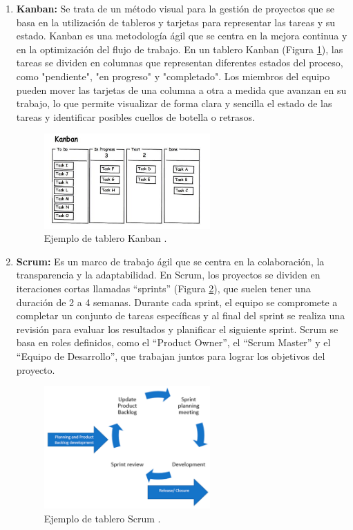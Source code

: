 \begin{enumerate}
    \item \textbf{Kanban:} Se trata de un método visual para la gestión de proyectos que se basa en la utilización de tableros y tarjetas para representar las tareas y su estado. Kanban es una metodología ágil que se centra en la mejora continua y en la optimización del flujo de trabajo. En un tablero Kanban (Figura \ref{fig:kanban}), las tareas se dividen en columnas que representan diferentes estados del proceso, como "pendiente", "en progreso" y "completado". Los miembros del equipo pueden mover las tarjetas de una columna a otra a medida que avanzan en su trabajo, lo que permite visualizar de forma clara y sencilla el estado de las tareas y identificar posibles cuellos de botella o retrasos.
    \begin{figure}[H]
        \centering
        \includegraphics[width=0.6\textwidth]{imagenes/kanban.png}
        \caption{Ejemplo de tablero Kanban \cite{kirovska2015usage}.}
        \label{fig:kanban}
    \end{figure}
    \item \textbf{Scrum:} Es un marco de trabajo ágil que se centra en la colaboración, la transparencia y la adaptabilidad. En Scrum, los proyectos se dividen en iteraciones cortas llamadas ``sprints'' (Figura \ref{fig:scrum}), que suelen tener una duración de 2 a 4 semanas. Durante cada sprint, el equipo se compromete a completar un conjunto de tareas específicas y al final del sprint se realiza una revisión para evaluar los resultados y planificar el siguiente sprint. Scrum se basa en roles definidos, como el ``Product Owner'', el ``Scrum Master'' y el ``Equipo de Desarrollo'', que trabajan juntos para lograr los objetivos del proyecto.
    \begin{figure}[H]
        \centering
        \includegraphics[width=0.6\textwidth]{imagenes/scrum.png}
        \caption{Ejemplo de tablero Scrum \cite{karabiyik2020understanding}.}
        \label{fig:scrum}
    \end{figure}
\end{enumerate}



